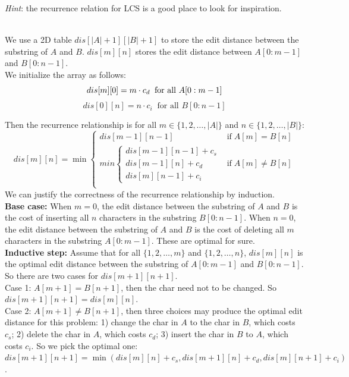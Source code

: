 \documentclass[11pt,addpoints]{exam}
\begin{document}
\begin{questions}
    \emph{Hint}: the recurrence relation for LCS is a good place to look for inspiration.
    
    \begin{solution}
    \\
    We use a 2D table $dis[|A|+1][|B|+1]$ to store the edit distance between the substring of $A$ and $B$. $dis[m][n]$ stores the edit distance between $A[0:m-1]$ and $B[0:n-1]$.\\ We initialize the array as follows:
    $$
    dis[m][0] = m \cdot c_d \;\; \text{for all }A[0:m-1]\\
    $$
    $$
    dis[0][n] = n \cdot c_i \;\; \text{for all }B[0:n-1]
    $$

    Then the recurrence relationship is for all $m \in \{1, 2, \ldots, |A|\}$ and $n \in \{1, 2, \ldots, |B|\}$:
    $$
    dis[m][n] = \min \begin{cases}
    dis[m-1][n-1] & \text{if} \; A[m] = B[n] \\
    min
    \begin{cases}
      dis[m-1][n-1] + c_s \\
    dis[m-1][n] + c_d \\
    dis[m][n-1] + c_i
    \end{cases} & \text{if} \; A[m] \not= B[n] \\
    \end{cases}
    $$
    We can justify the correctness of the recurrence relationship by induction.\\
    \textbf{Base case:} 
    When $m=0$, the edit distance between the substring of $A$ and $B$ is the cost of inserting all $n$ characters in the substring $B[0:n-1]$. When $n=0$, the edit distance between the substring of $A$ and $B$ is the cost of deleting all $m$ characters in the substring $A[0:m-1]$. These are optimal for sure.\\
    
    \textbf{Inductive step:}
    Assume that for all $\{1, 2, \ldots, m\}$ and $\{1, 2, \ldots, n\}$, $dis[m][n]$ is the optimal edit distance between the substring of $A[0:m-1]$ and $B[0:n-1]$.\\
    So there are two cases for $dis[m+1][n+1]$. \\
    Case 1: $A[m+1] = B[n+1]$, then the char need not to be changed. So $dis[m+1][n+1] = dis[m][n]$. \\
    Case 2: $A[m+1] \not= B[n+1]$, then three choices may produce the optimal edit distance for this problem: 1) change the char in $A$ to the char in $B$, which costs $c_s$; 2) delete the char in $A$, which costs $c_d$; 3) insert the char in $B$ to $A$, which costs $c_i$. So we pick the optimal one: $dis[m+1][n+1] = \min(dis[m][n] + c_s, dis[m+1][n] + c_d, dis[m][n+1] + c_i)$.\\


\end{solution}
\end{questions}
\end{document}

